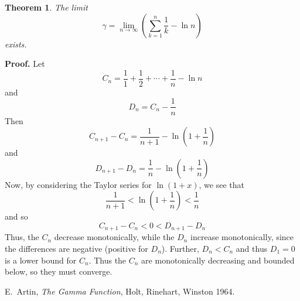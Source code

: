 \documentclass[12pt]{article}
\newtheorem{thm}{Theorem}
\begin{document}
\begin{thm} The limit
\[\gamma = \lim_{n\to\infty}\left(\sum_{k=1}^n \frac{1}{k} - \ln n\right)\]
exists.
\end{thm}

\textbf{Proof. } Let
\[C_n=\frac{1}{1}+\frac{1}{2}+\cdots+\frac{1}{n}-\ln n\]
and
\[D_n=C_n-\frac{1}{n}\]
Then
\[C_{n+1}-C_n=\frac{1}{n+1}-\ln\left(1+\frac{1}{n}\right)\]
and
\[D_{n+1}-D_n=\frac{1}{n}-\ln\left(1+\frac{1}{n}\right)\]
Now, by considering the Taylor series for $\ln(1+x)$, we see that
\[\frac{1}{n+1}<\ln\left(1+\frac{1}{n}\right)<\frac{1}{n}\]
and so
\[C_{n+1}-C_n < 0 < D_{n+1}-D_n\]
Thus, the $C_n$ decrease monotonically, while the $D_n$ increase monotonically, since the differences are negative (positive for $D_n$). Further, $D_n<C_n$ and thus $D_1=0$ is a lower bound for $C_n$. Thus the $C_n$ are monotonically decreasing and bounded below, so they must converge.


\begin{thebibliography}{10}
E.~Artin, \emph{The Gamma Function}, Holt, Rinehart, Winston 1964.
\end{thebibliography}
\end{document}
